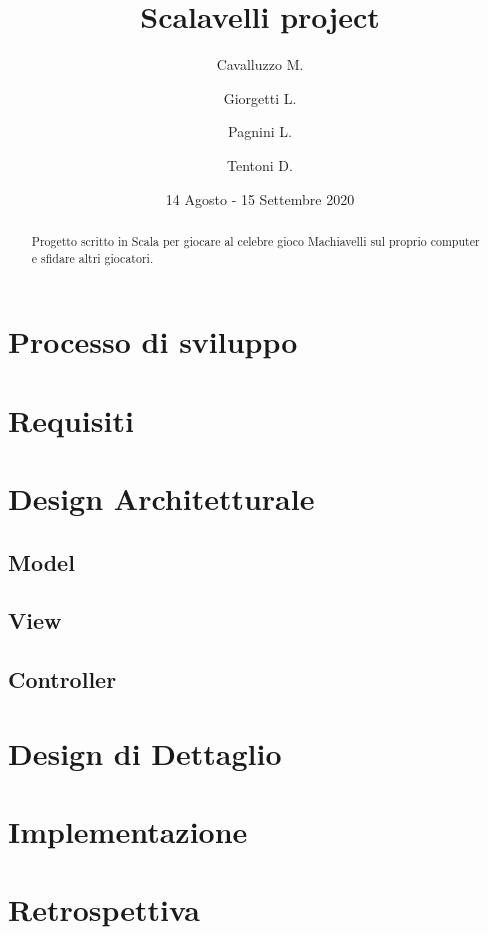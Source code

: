 \documentclass{article}
\title{Scalavelli project}
\date{14 Agosto - 15 Settembre 2020}
\author{
Cavalluzzo M.
\and
Giorgetti L.
\and
Pagnini L.
\and
Tentoni D.
}
\begin{document}
  \maketitle
  \newpage

  \begin{abstract}
    Progetto scritto in Scala per giocare al celebre gioco Machiavelli sul proprio computer e sfidare altri giocatori.
  \end{abstract}

  \tableofcontents

  \newpage


  \section{Processo di sviluppo}\label{sec:processo-di-sviluppo}
  


  \section{Requisiti}\label{sec:requisiti}
  


  \section{Design Architetturale}\label{sec:design-architetturale}

  \subsection{Model}

  \subsection{View}

  \subsection{Controller}

  \newpage


  \section{Design di Dettaglio}\label{sec:design-di-dettaglio}
  


  \section{Implementazione}\label{sec:implementazione}
  


  \section{Retrospettiva}\label{sec:retrospettiva}
  
\end{document}

